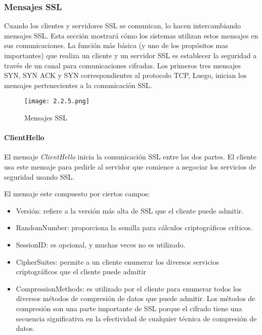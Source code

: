 \subsubsection*{Mensajes SSL}
Cuando los clientes y servidores SSL se comunican, lo hacen 
intercambiando mensajes SSL. Esta sección mostrará cómo los 
sistemas utilizan estos mensajes en sus comunicaciones. La función 
más básica (y uno de los propósitos mas importantes) que realiza 
un cliente y un servidor SSL es establecer la seguridad a través
de un canal para comunicaciones cifradas. Los primeros tres mensajes
SYN, SYN ACK y SYN correspondientes al protocolo TCP, Luego, inician los 
mensajes pertenecientes a la comunicación SSL.


\begin{center}
   \begin{figure}   
      \begin{center}
         \texttt{[image: 2.2.5.png]}
      \end{center}
      \caption{Mensajes SSL}
   \end{figure}
\end{center}


\paragraph*{ClientHello}
El mensaje \emph{ClientHello} inicia la comunicación SSL entre las dos partes. 
El cliente usa este mensaje para pedirle al servidor que comience a 
negociar los servicios de seguridad usando SSL.

El mensaje este compuesto por ciertos campos: 
\begin{itemize}
   \setlength\itemsep{-0.6em}
   \item Versión: refiere a la versión más alta de SSL que el cliente 
   puede admitir. 
   \item RandomNumber: proporciona la semilla para cálculos criptográficos
   críticos. 
   \item SessionID: es opcional, y muchas veces no es utilizado. 
   \item CipherSuites: permite a un cliente enumerar los diversos 
   servicios criptográficos que el cliente puede admitir
   \item CompressionMethods: es utilizado por el cliente para enumerar 
   todos los diversos métodos de compresión de datos que puede admitir.
    Los métodos de compresión son una parte importante de SSL porque el 
    cifrado tiene una secuencia significativa en la efectividad de 
    cualquier técnica de compresión de datos. 
\end{itemize}


